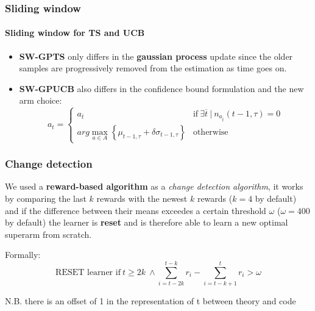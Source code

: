 
\begin{frame}
\frametitle{Sliding window}
\framesubtitle{Sliding window for TS and UCB}

\begin{itemize}[leftmargin=*, label={$\circ$}]
    \item \textbf{SW-GPTS} only differs in the \textbf{gaussian process} update since the older samples are progressively removed from the estimation as time goes on.
    \item \textbf{SW-GPUCB} also differs in the confidence bound formulation and the new arm choice:
        \begin{displaymath}
            a_t =
            \begin{cases}
                a_{\overline{t}} & \text{if} ~ \exists \overline{t} ~ | ~ n_{a_{\overline{t}}}(t-1, \tau) = 0 \\
                arg\max_{a \in A} \left\{ \mu_{t-1, \tau} + \delta \sigma_{t-1, \tau} \right\} & \text{otherwise}
            \end{cases}
        \end{displaymath}
\end{itemize}

\end{frame}


\begin{frame}
\frametitle{Change detection}

We used a \textbf{reward-based algorithm} as a \textit{change detection algorithm}, it works by comparing the last $k$ rewards with the newest $k$ rewards ($k=4$ by default) and if the difference between their means exceedes a certain threshold $\omega$ ($\omega=400$ by default) the learner is \textbf{reset} and is therefore able to learn a new optimal superarm from scratch.

Formally:
\begin{displaymath}
    \text{RESET learner if} ~ t \geq 2k ~ \land \sum_{i=t-2k}^{t-k} r_i -\sum_{i=t-k+1}^t r_i > \omega
\end{displaymath}

\scriptsize N.B. there is an offset of 1 in the representation of t between theory and code

\end{frame}


